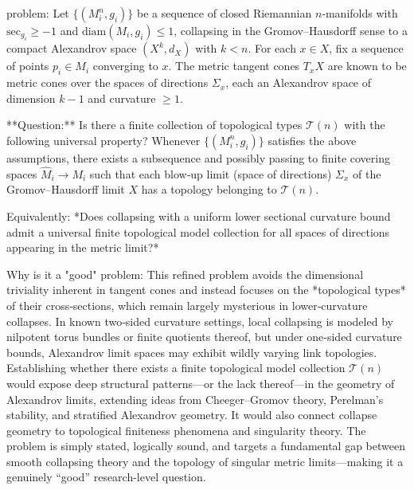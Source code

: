 problem:  
Let $\{(M_i^n,g_i)\}$ be a sequence of closed Riemannian $n$‑manifolds with $\mathrm{sec}_{g_i}\ge -1$ and $\mathrm{diam}(M_i,g_i)\le1$, collapsing in the Gromov–Hausdorff sense to a compact Alexandrov space $(X^k,d_X)$ with $k<n$.  
For each $x\in X$, fix a sequence of points $p_i\in M_i$ converging to $x$. The metric tangent cones $T_xX$ are known to be metric cones over the spaces of directions $\Sigma_x$, each an Alexandrov space of dimension $k-1$ and curvature $\ge1$.  

**Question:**  
Is there a finite collection of topological types $\mathcal{T}(n)$ with the following universal property?  
Whenever $\{(M_i^n,g_i)\}$ satisfies the above assumptions, there exists a subsequence and possibly passing to finite covering spaces $\widehat M_i\to M_i$ such that each blow‑up limit (space of directions) $\Sigma_x$ of the Gromov–Hausdorff limit $X$ has a topology belonging to $\mathcal{T}(n)$.  

Equivalently: *Does collapsing with a uniform lower sectional curvature bound admit a universal finite topological model collection for all spaces of directions appearing in the metric limit?*  

Why is it a "good" problem:  
This refined problem avoids the dimensional triviality inherent in tangent cones and instead focuses on the *topological types* of their cross‑sections, which remain largely mysterious in lower‑curvature collapses. In known two‑sided curvature settings, local collapsing is modeled by nilpotent torus bundles or finite quotients thereof, but under one‑sided curvature bounds, Alexandrov limit spaces may exhibit wildly varying link topologies.  
Establishing whether there exists a finite topological model collection $\mathcal{T}(n)$ would expose deep structural patterns—or the lack thereof—in the geometry of Alexandrov limits, extending ideas from Cheeger–Gromov theory, Perelman’s stability, and stratified Alexandrov geometry. It would also connect collapse geometry to topological finiteness phenomena and singularity theory. The problem is simply stated, logically sound, and targets a fundamental gap between smooth collapsing theory and the topology of singular metric limits—making it a genuinely “good” research-level question.